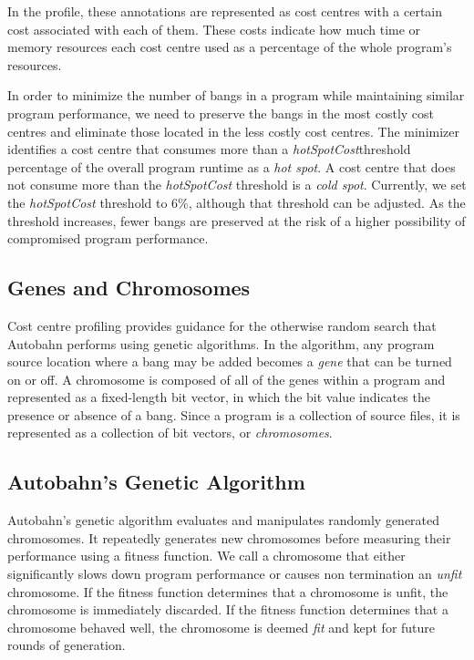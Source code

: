 \documentclass[format=sigplan]{acmart}
\newcommand{\hotspot}[0]{hot spot}
\newcommand{\coldspot}[0]{cold spot}
\newcommand{\hotspotcost}[0]{\textit{hotSpotCost}}
\newcommand{\unfit}[0]{unfit}
\newcommand{\fit}[0]{\textit{fit}}
\begin{document}
In the profile, these annotations are represented as cost centres with a 
certain cost associated with each of them. These costs indicate how much
time or memory resources each cost centre used as a percentage of the
whole program's resources. 

In order to minimize the number of bangs in 
a program while maintaining similar program performance, we need to 
preserve the bangs in the most costly cost centres and eliminate those 
located in the less costly cost centres. The minimizer identifies a cost centre that consumes more than a \hotspotcost{}threshold percentage of the overall program runtime as a \textit{\hotspot{}}. A cost centre that does not consume more than the \hotspotcost{} threshold is a \textit{\coldspot{}}. Currently, we set the \hotspotcost{} threshold to 6\%, although that threshold can be
adjusted. As the threshold increases, fewer bangs
are preserved at the risk of a higher possibility of compromised program 
performance. 

\subsection{Genes and Chromosomes}

Cost centre profiling provides guidance for the otherwise random search 
that Autobahn performs using genetic algorithms. In the algorithm, any 
program source location where a bang may be added becomes a \textit{gene} that can 
be turned on or off. A chromosome is composed of all of the genes within a 
program and represented as a fixed-length bit vector, in which the bit value 
indicates the presence or absence of a bang. Since a program is a collection of source files, it is represented as a collection of bit vectors, or \textit{chromosomes}.

\subsection{Autobahn's Genetic Algorithm}

Autobahn's genetic algorithm evaluates and manipulates randomly generated chromosomes. It repeatedly generates new chromosomes before measuring their performance using a fitness function. We call a chromosome that either significantly slows down program performance or causes non termination an \textit{\unfit{}} chromosome. If the fitness function determines that a chromosome is \unfit{}, the chromosome is immediately discarded. If the fitness function determines that a chromosome behaved well, the chromosome is deemed \textit{\fit{}} and kept for future rounds of generation. 
\end{document}
